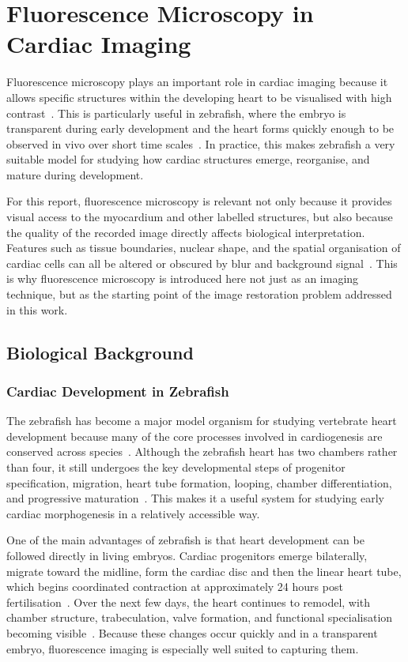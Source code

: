 \section{Fluorescence Microscopy in Cardiac Imaging}

Fluorescence microscopy plays an important role in cardiac imaging because it allows specific structures within the developing heart to be visualised with high contrast~\cite{...}. This is particularly useful in zebrafish, where the embryo is transparent during early development and the heart forms quickly enough to be observed in vivo over short time scales~\cite{...}. In practice, this makes zebrafish a very suitable model for studying how cardiac structures emerge, reorganise, and mature during development.

For this report, fluorescence microscopy is relevant not only because it provides visual access to the myocardium and other labelled structures, but also because the quality of the recorded image directly affects biological interpretation. Features such as tissue boundaries, nuclear shape, and the spatial organisation of cardiac cells can all be altered or obscured by blur and background signal~\cite{...}. This is why fluorescence microscopy is introduced here not just as an imaging technique, but as the starting point of the image restoration problem addressed in this work.

\subsection{Biological Background}

\subsubsection{Cardiac Development in Zebrafish}

The zebrafish has become a major model organism for studying vertebrate heart development because many of the core processes involved in cardiogenesis are conserved across species~\cite{...}. Although the zebrafish heart has two chambers rather than four, it still undergoes the key developmental steps of progenitor specification, migration, heart tube formation, looping, chamber differentiation, and progressive maturation~\cite{...}. This makes it a useful system for studying early cardiac morphogenesis in a relatively accessible way.

One of the main advantages of zebrafish is that heart development can be followed directly in living embryos. Cardiac progenitors emerge bilaterally, migrate toward the midline, form the cardiac disc and then the linear heart tube, which begins coordinated contraction at approximately 24 hours post fertilisation~\cite{...}. Over the next few days, the heart continues to remodel, with chamber structure, trabeculation, valve formation, and functional specialisation becoming visible~\cite{...}. Because these changes occur quickly and in a transparent embryo, fluorescence imaging is especially well suited to capturing them.

